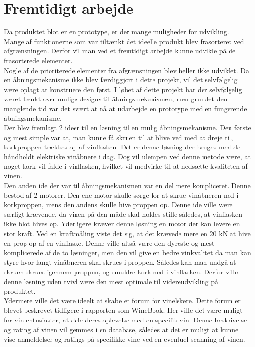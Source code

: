 \chapter{Fremtidigt arbejde}

Da produktet blot er en prototype, er der mange muligheder for udvikling. Mange af funktionerne som var tiltænkt det ideelle produkt blev frasorteret ved afgrænsningen. Derfor vil man ved et fremtidigt arbejde kunne udvikle på de frasorterede elementer.
\\

Nogle af de prioriterede elementer fra afgrænsningen blev heller ikke udviklet. Da en åbningsmekanisme ikke blev færdiggjort i dette projekt, vil det selvfølgelig være oplagt at konstruere den først. I løbet af dette projekt har der selvfølgelig været tænkt over mulige designs til åbningsmekanismen, men grundet den manglende tid var det svært at nå at udarbejde en prototype med en fungerende åbningsmekanisme. 
\\

Der blev fremlagt 2 ideer til en løsning til en mulig åbningsmekanisme. Den første og mest simple var at, man kunne få skruen til at blive ved med at dreje til, korkproppen trækkes op af vinflasken. Det er denne løsning der bruges med de håndholdt elektriske vinåbnere i dag. Dog vil ulempen ved denne metode være, at noget kork vil falde i vinflasken, hvilket vil medvirke til at nedsætte kvaliteten af vinen.
\\

Den anden ide der var til åbningsmekanismen var en del mere kompliceret. Denne bestod af 2 motorer. Den ene motor skulle sørge for at skrue vinåbneren ned i korkproppen, mens den andens skulle hive proppen op. Denne ide ville være særligt krævende, da vinen på den måde skal holdes stille således, at vinflasken ikke blot hives op. Yderligere kræver denne løsning en motor der kan levere en stor kraft. Ved en kraftmåling viste det sig, at det krævede mere en 20 kN at hive en prop op af en vinflaske. Denne ville altså være den dyreste og mest komplicerede af de to løsninger, men den vil give en bedre vinkvalitet da man kan styre hvor langt vinåbneren skal skrues i proppen. Således kan man undgå at skruen skrues igennem proppen, og smuldre kork ned i vinflasken. Derfor ville denne løsning uden tvivl være den mest optimale til videreudvikling på produktet.
\\

Ydermere ville det være ideelt at skabe et forum for vinelskere. Dette forum er blevet beskrevet tidligere i rapporten som WineBook. Her ville det være muligt for vin entusiaster, at dele deres oplevelse med en specifik vin. Denne beskrivelse og rating af vinen vil gemmes i en database, således at det er muligt at kunne vise anmeldelser og ratings på specifikke vine ved en eventuel scanning af vinen.
\\

